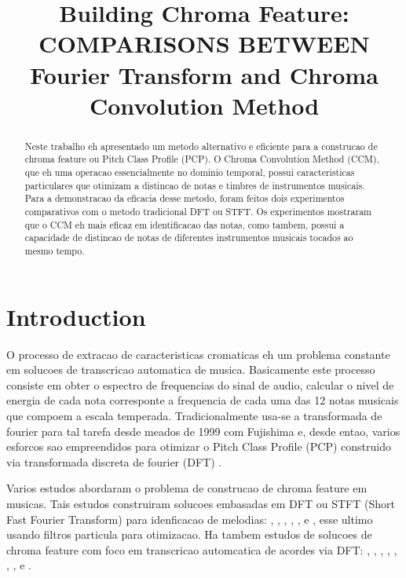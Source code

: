 \documentclass{article}
\title{Building Chroma Feature: COMPARISONS BETWEEN Fourier Transform and Chroma Convolution Method}
\begin{document}
%
\maketitle
%
\begin{abstract}

Neste trabalho eh apresentado um metodo alternativo e eficiente para a construcao de chroma feature ou Pitch Class Profile (PCP). O Chroma Convolution Method (CCM), que eh uma operacao essencialmente no dominio temporal, possui caracteristicas particulares que otimizam a distincao de notas e timbres de instrumentos musicais. Para a demonstracao da eficacia desse metodo, foram feitos dois experimentos comparativos com o metodo tradicional DFT ou STFT. Os experimentos mostraram que o CCM eh mais eficaz em identificacao das notas, como tambem, possui a capacidade de distincao de notas de diferentes instrumentos musicais tocados ao mesmo tempo.  

\end{abstract}
%
\section{Introduction}\label{sec:introduction}


	O processo de extracao de caracteristicas cromaticas eh um problema constante em solucoes de transcricao automatica de musica. Basicamente este processo consiste em obter o espectro de frequencias do sinal de audio, calcular o nivel de energia de cada nota corresponte a frequencia de cada uma das 12 notas musicais que compoem a escala temperada. Tradicionalmente usa-se a transformada de fourier para tal tarefa desde meados de 1999 com Fujishima \cite{fujishima1999realtime} e, desde entao, varios esforcos sao empreendidos para otimizar o Pitch Class Profile (PCP) construido via transformada discreta de fourier (DFT) .

	Varios estudos abordaram o problema de construcao de chroma feature em musicas. Tais estudos construiram solucoes embasadas em DFT ou STFT (Short Fast Fourier Transform) para idenficacao de melodias: \cite{muto2002transcription}, \cite{al2008time}, \cite{barbancho2009transcription}, \cite{gomez2004automatic}, \cite{tangmelody}, \cite{eggink2004extracting} e \cite{jo2010melody}, esse ultimo usando filtros particula para otimizacao. Ha tambem estudos de solucoes de chroma feature com foco em transcricao automcatica de acordes via DFT:
	\cite{harte2009automatic}, \cite{khadkevich2011time}, \cite{harte2010towards}, \cite{peeters2006chroma}, \cite{cho2010exploring} \cite{lee2006automatic}, \cite{de2012improving}, \cite{boulanger2013audio}, \cite{chen2012chord} e \cite{hrybyk2010combined}.
\end{document}

